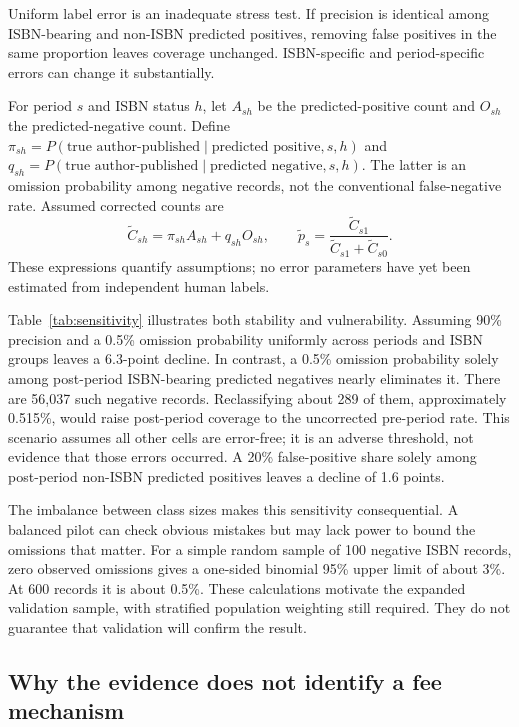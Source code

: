 \documentclass[11pt]{article}
\begin{document}
Uniform label error is an inadequate stress test. If precision is identical among ISBN-bearing and non-ISBN predicted positives, removing false positives in the same proportion leaves coverage unchanged. ISBN-specific and period-specific errors can change it substantially.

For period $s$ and ISBN status $h$, let $A_{sh}$ be the predicted-positive count and $O_{sh}$ the predicted-negative count. Define $\pi_{sh}=P(\text{true author-published}\mid\text{predicted positive},s,h)$ and $q_{sh}=P(\text{true author-published}\mid\text{predicted negative},s,h)$. The latter is an omission probability among negative records, not the conventional false-negative rate. Assumed corrected counts are
\begin{equation}\label{eq:correction}
\widetilde C_{sh}=\pi_{sh}A_{sh}+q_{sh}O_{sh},\qquad
\widetilde p_s=\frac{\widetilde C_{s1}}{\widetilde C_{s1}+\widetilde C_{s0}}.
\end{equation}
These expressions quantify assumptions; no error parameters have yet been estimated from independent human labels.



Table~\ref{tab:sensitivity} illustrates both stability and vulnerability. Assuming 90\% precision and a 0.5\% omission probability uniformly across periods and ISBN groups leaves a 6.3-point decline. In contrast, a 0.5\% omission probability solely among post-period ISBN-bearing predicted negatives nearly eliminates it. There are 56,037 such negative records. Reclassifying about 289 of them, approximately 0.515\%, would raise post-period coverage to the uncorrected pre-period rate. This scenario assumes all other cells are error-free; it is an adverse threshold, not evidence that those errors occurred. A 20\% false-positive share solely among post-period non-ISBN predicted positives leaves a decline of 1.6 points.

The imbalance between class sizes makes this sensitivity consequential. A balanced pilot can check obvious mistakes but may lack power to bound the omissions that matter. For a simple random sample of 100 negative ISBN records, zero observed omissions gives a one-sided binomial 95\% upper limit of about 3\%. At 600 records it is about 0.5\%. These calculations motivate the expanded validation sample, with stratified population weighting still required. They do not guarantee that validation will confirm the result.

\subsection{Why the evidence does not identify a fee mechanism}
\end{document}
